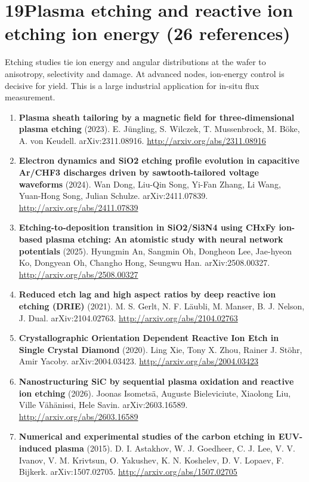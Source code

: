 \documentclass[11pt,a4paper]{article}
\begin{document}
\section*{19\quad Plasma etching and reactive ion etching ion energy \textnormal{(\normalsize 26 references)}}
Etching studies tie ion energy and angular distributions at the wafer to anisotropy, selectivity and damage. At advanced nodes, ion-energy control is decisive for yield. This is a large industrial application for in-situ flux measurement.
\begin{enumerate}[leftmargin=1.4em]
\item \textbf{Plasma sheath tailoring by a magnetic field for three-dimensional plasma etching} (2023). E. Jüngling, S. Wilczek, T. Mussenbrock, M. Böke, A. von Keudell. arXiv:2311.08916. \url{http://arxiv.org/abs/2311.08916}
\item \textbf{Electron dynamics and SiO2 etching profile evolution in capacitive Ar/CHF3 discharges driven by sawtooth-tailored voltage waveforms} (2024). Wan Dong, Liu-Qin Song, Yi-Fan Zhang, Li Wang, Yuan-Hong Song, Julian Schulze. arXiv:2411.07839. \url{http://arxiv.org/abs/2411.07839}
\item \textbf{Etching-to-deposition transition in SiO2/Si3N4 using CHxFy ion-based plasma etching: An atomistic study with neural network potentials} (2025). Hyungmin An, Sangmin Oh, Dongheon Lee, Jae-hyeon Ko, Dongyean Oh, Changho Hong, Seungwu Han. arXiv:2508.00327. \url{http://arxiv.org/abs/2508.00327}
\item \textbf{Reduced etch lag and high aspect ratios by deep reactive ion etching (DRIE)} (2021). M. S. Gerlt, N. F. Läubli, M. Manser, B. J. Nelson, J. Dual. arXiv:2104.02763. \url{http://arxiv.org/abs/2104.02763}
\item \textbf{Crystallographic Orientation Dependent Reactive Ion Etch in Single Crystal Diamond} (2020). Ling Xie, Tony X. Zhou, Rainer J. Stöhr, Amir Yacoby. arXiv:2004.03423. \url{http://arxiv.org/abs/2004.03423}
\item \textbf{Nanostructuring SiC by sequential plasma oxidation and reactive ion etching} (2026). Joonas Isometsä, Auguste Bieleviciute, Xiaolong Liu, Ville Vähänissi, Hele Savin. arXiv:2603.16589. \url{http://arxiv.org/abs/2603.16589}
\item \textbf{Numerical and experimental studies of the carbon etching in EUV-induced plasma} (2015). D. I. Astakhov, W. J. Goedheer, C. J. Lee, V. V. Ivanov, V. M. Krivtsun, O. Yakushev, K. N. Koshelev, D. V. Lopaev, F. Bijkerk. arXiv:1507.02705. \url{http://arxiv.org/abs/1507.02705}

\end{enumerate}
\end{document}
